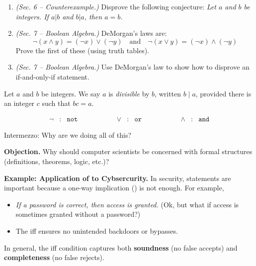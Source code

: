 \documentclass[10pt]{beamer}
\begin{document}
\begin{frame}
\small 
 \begin{myredbox}[title=Weekly Quiz] 
\begin{enumerate}
	\item  \textit{(Sec. 6 -- Counterexample.)}  Disprove the following conjecture: \textit{Let $a$ and $b$ be integers.  If $a|b$ and $b|a$, then $a=b$.}
	\item \textit{(Sec. 7 -- Boolean Algebra.)} DeMorgan's laws are:
	\[ \lnot (x \land y) = (\lnot x) \lor (\lnot y) \quad \text{and} \quad \lnot (x \lor y) = (\lnot x) \land (\lnot y) \]
	Prove the first of these (using truth tables). 
	\item \textit{(Sec. 7 -- Boolean Algebra.)}  Use DeMorgan's law to show how to disprove an if-and-only-if statement.
\end{enumerate}
\end{myredbox}

\vfill 
\begin{mygreenbox}[title=Reference Material: Scheinerman Definition 3.2] Let $a$ and $b$ be integers.  We say $a$ is \textit{divisible} by $b$, written $b \mid a$, provided there is an integer $c$ such that $bc=a$. 	
\end{mygreenbox}

\vfill 
\begin{myyellowbox}[title=Notation reminder]
\[
\begin{array}{rclcrclcrcl}
\lnot & : & \texttt{not} &\qquad \qquad & \lor     & : & \texttt{or}    \qquad \qquad &  & \land & : & \texttt{and}
\end{array}
\]
\end{myyellowbox}

\end{frame}



\begin{frame}{Intermezzo: Why are we doing all of this?}


\colorbox{red!30}{\textbf{Objection.}} Why should computer scientists be concerned with formal structures (definitions, theorems, logic, etc.)?

\pause 
\vfill \vfill 
\colorbox{green!30}{\textbf{Example: Application of  to Cybsercurity.}} In security,  statements are important because a one-way implication () is not enough.
\pause 
For example,
\begin{itemize}
	\item \textit{If a password is correct, then access is granted.} (Ok, but what if access is sometimes granted without a password?) \pause 
	\item  The iff ensures no unintended backdoors or bypasses. \pause 
\end{itemize}


In general, the iff condition captures both \textbf{soundness} (no false accepts) and \textbf{completeness} (no false rejects).
\end{frame}
\end{document}

